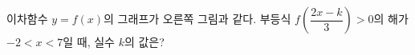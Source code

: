 \noindent\begin{minipage}[t]{0.58\linewidth}\vspace{0pt}\raggedright 이차함수 $y=f(x)$의 그래프가 오른쪽 그림과 같다. 부등식 $f\left(\dfrac{2x-k}{3}\right)>0$의 해가 $-2<x<7$일 때, 실수 $k$의 값은?\end{minipage}\hfill\begin{minipage}[t]{0.4\linewidth}\vspace{0pt}\centering \resizebox{\ifdim\width>\linewidth\linewidth\else\width\fi}{!}{}\end{minipage}\par
{}
